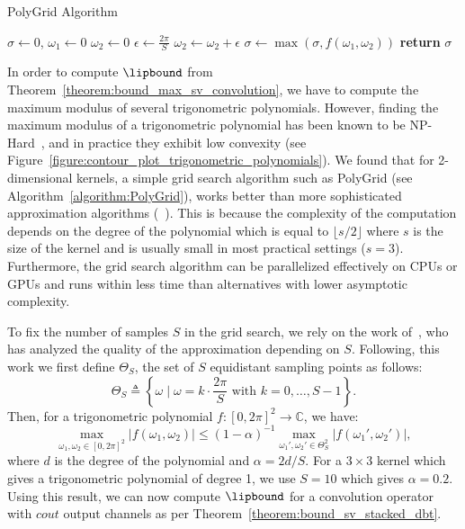 \begin{algorithm}
  \caption{PolyGrid Algorithm} \label{algorithm:PolyGrid}
  \begin{algorithmic}[1]
      \State $\sigma \gets 0$, 
      \State $\omega_1 \gets 0$
      \State $\omega_2 \gets 0$
      \State $\epsilon \gets \frac{2\pi}{S}$
	  \State $\omega_2 \gets \omega_2 + \epsilon$
	  \State $\sigma \gets \max( \sigma, f(\omega_1, \omega_2))$
	\EndFor
      \EndFor
      \State \textbf{return} $\sigma$ 
    \EndProcedure
  \end{algorithmic}
\end{algorithm}

In order to compute $\lipbound$ from Theorem~\ref{theorem:bound_max_sv_convolution}, we have to compute the maximum modulus of several trigonometric polynomials.
However, finding the maximum modulus of a trigonometric polynomial has been known to be NP-Hard~\cite{pfister2018bounding}, and in practice they exhibit low convexity (see Figure~\ref{figure:contour_plot_trigonometric_polynomials}).
We found that for 2-dimensional kernels, a simple grid search algorithm such as PolyGrid (see Algorithm~\ref{algorithm:PolyGrid}), works better than more sophisticated approximation algorithms (\eg ~\citet{green1999calculating,de2009finding}).
This is because the complexity of the computation depends on the degree of the polynomial which is equal to $\lfloor s / 2 \rfloor$ where $s$ is the size of the kernel and is usually small in most practical settings (\eg $s=3$).
Furthermore, the grid search algorithm can be parallelized effectively on CPUs or GPUs and runs within less time than alternatives with lower asymptotic complexity. 

To fix the number of samples $S$ in the grid search, we rely on the work of~\cite{pfister2018bounding}, who has analyzed the quality of the approximation depending on $S$.
Following, this work we first define $\Theta_S$, the set of $S$ equidistant sampling points as follows:
\begin{equation}
  \Theta_S \triangleq \left\{ \omega \mid \omega = k \cdot \frac{2\pi}{S} \mbox{ with }  k = 0,\ldots, S-1 \right\}.
\end{equation}
Then, for a trigonometric polynomial $f: [0, 2\pi]^2 \rightarrow \mathbb{C}$, we have:
\begin{equation}
  \max_{\omega_1, \omega_2 \in [0,2\pi]^2} \left| f(\omega_1, \omega_2) \right| \leq (1 - \alpha)^{-1} \max_{\omega_1', \omega_2' \in \Theta_S^2} \left| f(\omega_1', \omega_2') \right|,
\end{equation}
where $d$ is the degree of the polynomial and $\alpha = 2d / S$.
For a $3\times3$ kernel which gives a trigonometric polynomial of degree 1, we use $S = 10$ which gives $\alpha = 0.2$.
Using this result, we can now compute $\lipbound$ for a convolution operator with $cout$ output channels as per Theorem~\ref{theorem:bound_sv_stacked_dbt}.
 
